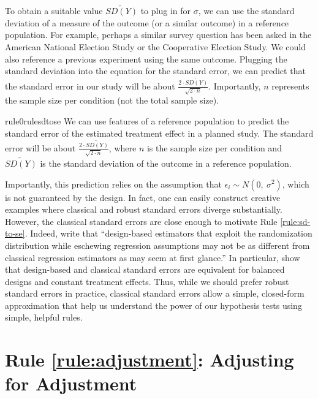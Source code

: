 \documentclass[12pt]{article}
\begin{document}
To obtain a suitable value $\widetilde{SD(Y)}$ to plug in for
$\sigma$, we can use the standard deviation of a measure of the
outcome (or a similar outcome) in a reference population. 
For example, perhaps a similar survey question has been asked in the American National Election Study or the Cooperative Election Study. 
We could also reference a previous experiment using the same outcome. 
Plugging the standard deviation into the equation for the standard error, we can predict that the standard error in our study will be about $\frac{2 \cdot \widetilde{SD(Y)}}{\sqrt{2 \cdot n}}$. 
Importantly, $n$ represents the sample size per condition (not the total sample size).

\begin{restatable}[SD to SE]{rule0}{rulesdtose}
\label{rule:sd-to-se}
We can use features of a reference population to predict the standard error of the estimated treatment effect in a planned study. The standard error will be about $\frac{2 \cdot \widetilde{SD(Y)}}{\sqrt{2 \cdot n}}$, where $n$ is the sample size per condition and $\widetilde{SD(Y)}$ is the standard deviation of the outcome in a reference population.
\end{restatable}

Importantly, this prediction relies on the assumption that $\epsilon_{i} \sim N\left( 0,\ \sigma^{2} \right)$, which is not guaranteed by the design. 
In fact, one can easily construct creative examples where classical and robust standard errors diverge substantially. 
However, the classical standard errors are close enough
to motivate Rule \ref{rule:sd-to-se}. 
Indeed, \citet[370]{Samii2012} write that ``design-based estimators that exploit the randomization distribution while eschewing regression assumptions may not be as different from classical regression estimators as may seem at first glance.'' 
In particular, \citet[370]{Samii2012} show that design-based and classical
standard errors are equivalent for balanced designs and constant
treatment effects. 
Thus, while we should prefer robust standard errors in practice, classical standard errors allow a simple, closed-form approximation that help us understand the power of our hypothesis tests using simple, helpful rules.

\section*{Rule \ref{rule:adjustment}: Adjusting for Adjustment}
\end{document}
